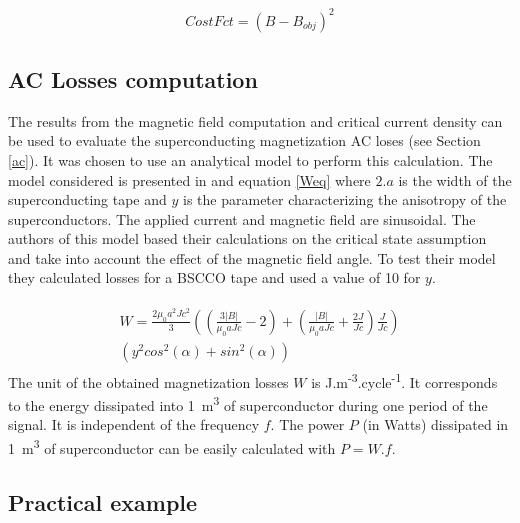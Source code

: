 \documentclass{ws-jmrr}
\begin{document}
\begin{multicols}{2}
\begin{align}
CostFct=\left ( B-B_{obj} \right )^{2}
\label{CostFct}
\end{align}

\subsection{AC Losses computation}
\label{aclosses}
The results from the magnetic field computation and critical current density can be used to evaluate the superconducting magnetization AC loses (see Section \ref{ac}). It was chosen to use an analytical model to perform this calculation. The model considered is presented in \cite{zhang2003angular} and equation \ref{Weq} where $2.a$ is the width of the superconducting tape and $y$ is the parameter characterizing the anisotropy of the superconductors. The applied current and magnetic field are sinusoidal. The authors of this model based their calculations on the critical state assumption \cite{bean1962magnetization} and take into account the effect of the magnetic field angle. To test their model they calculated losses for a BSCCO tape and used a value of 10 for $y$. \par

\begin{align}
\begin{split}
W=\frac{2\mu_0a^2Jc^2}{3}\left ( \left (\frac{3\left |B  \right |}{\mu_0aJc}-2  \right  )+\left (\frac{\left |B  \right |}{\mu_0aJc}+\frac{2J}{Jc}  \right )\frac{J}{Jc}\right ) \\ \left ( y^2cos^2(\alpha )+sin^2(\alpha ) \right )
\label{Weq}
\end{split}
\end{align}
The unit of the obtained magnetization losses $W$ is J.m\textsuperscript{-3}.cycle\textsuperscript{-1}. It corresponds to the energy dissipated into 1~m\textsuperscript{3} of superconductor during one period of the signal. It is independent of the frequency $f$. The power $P$ (in Watts) dissipated in 1~m\textsuperscript{3} of superconductor can be easily calculated with $P=W.f$.    

\subsection{Practical example}


\end{multicols}
\end{document}
